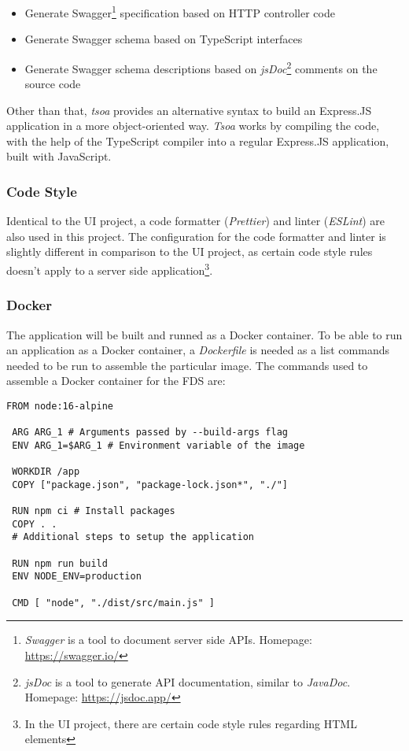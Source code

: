    \begin{itemize}
    \item Generate Swagger\footnote{\emph{Swagger} is a tool to document server side APIs. Homepage: \url{https://swagger.io/}} specification based on HTTP controller code
    \item Generate Swagger schema based on TypeScript interfaces
    \item Generate Swagger schema descriptions based on \emph{jsDoc}\footnote{\emph{jsDoc} is a tool to generate API documentation, similar to \emph{JavaDoc}. Homepage: \url{https://jsdoc.app/}} comments on the source code
   \end{itemize}
  
  Other than that, \emph{tsoa} provides an alternative syntax to build an Express.JS application in a more object-oriented way. \emph{Tsoa} works by compiling the code, with the help of the TypeScript compiler into a regular Express.JS application, built with JavaScript. 

  \subsubsection{Code Style}
  Identical to the UI project, a code formatter (\emph{Prettier}) and linter (\emph{ESLint}) are also used in this project. The configuration for the code formatter and linter is slightly different in comparison to the UI project, as certain code style rules doesn't apply to a server side application\footnote{In the UI project, there are certain code style rules regarding HTML elements}.

  \subsubsection{Docker}
  The application will be built and runned as a Docker container. To be able to run an application as a Docker container, a \emph{Dockerfile} is needed as a list commands needed to be run to assemble the particular image. The commands used to assemble a Docker container for the FDS are:

   \begin{lstlisting}[caption={Dockerfile for FDS (Docker)}, language=docker]
 FROM node:16-alpine

 ARG ARG_1 # Arguments passed by --build-args flag
 ENV ARG_1=$ARG_1 # Environment variable of the image

 WORKDIR /app
 COPY ["package.json", "package-lock.json*", "./"]

 RUN npm ci # Install packages
 COPY . .
 # Additional steps to setup the application

 RUN npm run build
 ENV NODE_ENV=production

 CMD [ "node", "./dist/src/main.js" ]
   \end{lstlisting}
  
